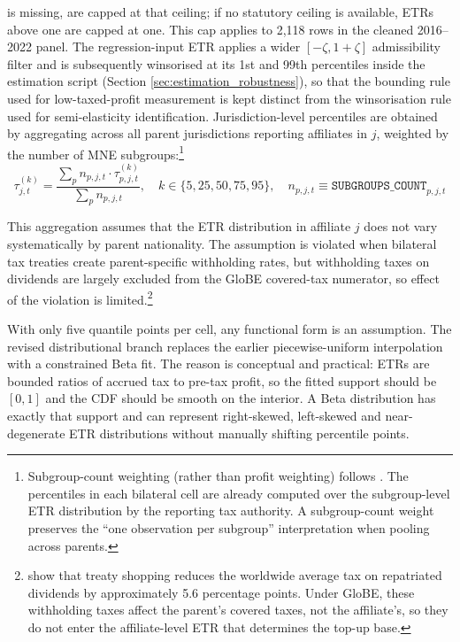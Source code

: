 \documentclass[11pt,a4paper]{article}
\newcommand{\code}[1]{\texttt{#1}}
\begin{document}
is missing, are capped at that ceiling; if no statutory ceiling is available, ETRs above one are capped at one. This cap applies to 2{,}118 rows in the cleaned 2016--2022 panel. The regression-input ETR applies a wider $[-\zeta, 1+\zeta]$ admissibility filter and is subsequently winsorised at its 1st and 99th percentiles inside the estimation script (Section \ref{sec:estimation_robustness}), so that the bounding rule used for low-taxed-profit measurement is kept distinct from the winsorisation rule used for semi-elasticity identification. Jurisdiction-level percentiles are obtained by aggregating across all parent jurisdictions reporting affiliates in $j$, weighted by the number of MNE subgroups:\footnote{Subgroup-count weighting (rather than profit weighting) follows \citet{hugger2026}. The percentiles in each bilateral cell are already computed over the subgroup-level ETR distribution by the reporting tax authority. A subgroup-count weight preserves the ``one observation per subgroup'' interpretation when pooling across parents.}
\begin{equation}\label{eq:jurisdiction_percentile}
\tau_{j,t}^{(k)} = \frac{\sum_p n_{p,j,t} \cdot \tau_{p,j,t}^{(k)}}{\sum_p n_{p,j,t}}, \quad k \in \{5, 25, 50, 75, 95\}, \quad n_{p,j,t} \equiv \code{SUBGROUPS\_COUNT}_{p,j,t}
\end{equation}

This aggregation assumes that the ETR distribution in affiliate $j$ does not vary systematically by parent nationality. The assumption is violated when bilateral tax treaties create parent-specific withholding rates, but withholding taxes on dividends are largely excluded from the GloBE covered-tax numerator, so effect of the violation is limited.\footnote{\citet{riet2025} show that treaty shopping reduces the worldwide average tax on repatriated dividends by approximately 5.6 percentage points. Under GloBE, these withholding taxes affect the parent's covered taxes, not the affiliate's, so they do not enter the affiliate-level ETR that determines the top-up base.}

With only five quantile points per cell, any functional form is an assumption. The revised distributional branch replaces the earlier piecewise-uniform interpolation with a constrained Beta fit. The reason is conceptual and practical: ETRs are bounded ratios of accrued tax to pre-tax profit, so the fitted support should be $[0,1]$ and the CDF should be smooth on the interior. A Beta distribution has exactly that support and can represent right-skewed, left-skewed and near-degenerate ETR distributions without manually shifting percentile points.
\end{document}
